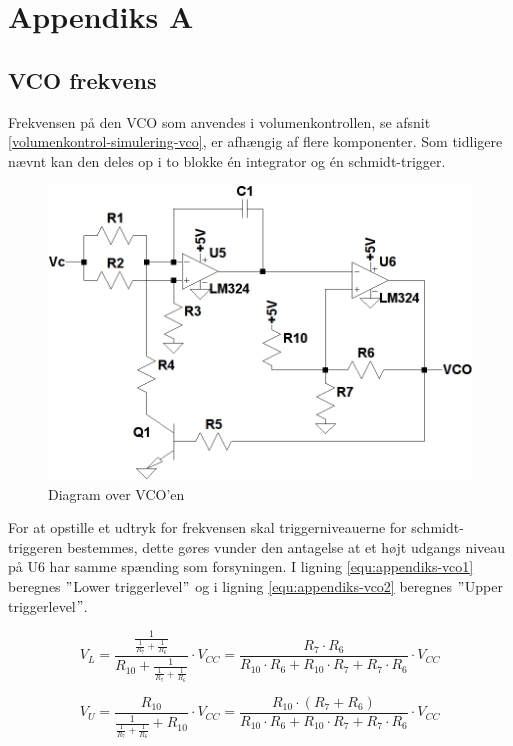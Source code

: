 \chapter{Appendiks A}
\label{vco-frekvens}
\section*{VCO frekvens}

Frekvensen på den VCO som anvendes i volumenkontrollen, se afsnit \ref{volumenkontrol-simulering-vco}, er afhængig af flere komponenter. Som tidligere nævnt kan den deles op i to blokke én integrator og én schmidt-trigger. 

\begin{figure}[h]
\centering
\includegraphics[width=\textwidth]{teknisk/volumenkontrol/vco.png}
\caption{Diagram over VCO'en}
\label{fig:appendiks-vco}
\end{figure}

For at opstille et udtryk for frekvensen skal triggerniveauerne for schmidt-triggeren bestemmes, dette gøres vunder den antagelse at et højt udgangs niveau på U6 har samme spænding som forsyningen. I ligning \ref{equ:appendiks-vco1} beregnes $"$Lower triggerlevel$"$ og i ligning \ref{equ:appendiks-vco2} beregnes $"$Upper triggerlevel$"$.

\begin{equation}
\label{equ:appendiks-vco1}
V_L = \frac{\frac{1}{\frac{1}{R_7} + \frac{1}{R_6}}}{R_{10} + \frac{1}{\frac{1}{R_7} + \frac{1}{R_6}}} \cdot V_{CC} = \frac{R_7 \cdot R_6}{R_{10} \cdot R_6 + R_{10} \cdot R_7 + R_7 \cdot R_6} \cdot V_{CC}
\end{equation}

\begin{equation}
\label{equ:appendiks-vco1}
V_U = \frac{R_{10}}{\frac{1}{\frac{1}{R_7} + \frac{1}{R_6}} + R_{10}} \cdot V_{CC} = \frac{R_{10} \cdot (R_7 + R_6)}{R_{10} \cdot R_6 + R_{10} \cdot R_7 + R_7 \cdot R_6} \cdot V_{CC}
\end{equation}